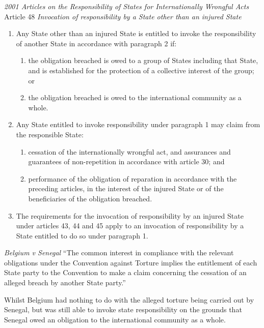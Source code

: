 \begin{conventiondetails}{\textit{2001 Articles on the Responsibility of States for Internationally Wrongful Acts} Article 48}
    \flushleft
    \textit{Invocation of responsibility by a State other than an injured State}

    \begin{enumerate}
        \item Any State other than an injured State is entitled to invoke the responsibility of another State in accordance with paragraph 2 if:
        \begin{enumerate}[label=(\alph*)]
            \item the obligation breached is owed to a group of States including that State, and is established for the protection of a collective interest of the group; or
            \item the obligation breached is owed to the international community as a whole.
        \end{enumerate}
        \item Any State entitled to invoke responsibility under paragraph 1 may claim from the responsible State:
        \begin{enumerate}[label=(\alph*)]
            \item cessation of the internationally wrongful act, and assurances and guarantees of non-repetition in
            accordance with article 30; and
            \item performance of the obligation of reparation in accordance with the preceding articles, in the interest of the injured State or of the beneficiaries of the obligation breached.
        \end{enumerate}
        \item The requirements for the invocation of responsibility by an injured State under articles 43, 44 and 45 apply to an invocation of responsibility by a State entitled to do so under paragraph 1.
    \end{enumerate}    
\end{conventiondetails}

\begin{casedetails}{\textit{Belgium v Senegal}}
    \flushleft
    ``The common interest in compliance with the relevant obligations under the Convention against Torture implies the entitlement of each State party to the Convention to make a claim concerning the cessation of an alleged breach by another State party.''

    \vspace{\baselineskip}

    Whilst Belgium had nothing to do with the alleged torture being carried out by Senegal, but was still able to invoke state responsibility on the grounds that Senegal owed an obligation to the international community as a whole.
\end{casedetails}

